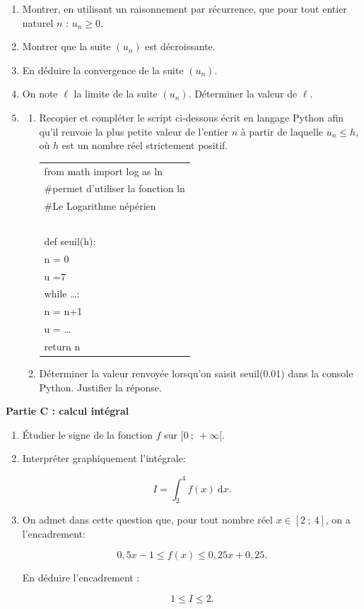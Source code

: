 \begin{enumerate}
\item Montrer, en utilisant un raisonnement par récurrence, que pour tout entier naturel $n$ :
$u_n \geqslant 0$.
\item Montrer que la suite $\left(u_n\right)$ est décroissante.
\item En déduire la convergence de la suite $\left(u_n\right)$.
\item On note $\ell$ la limite de la suite $\left(u_n\right)$. Déterminer la valeur de $\ell$. \item
	\begin{enumerate}
		\item Recopier et compléter le script ci-dessous écrit en langage Python afin qu'il
renvoie la plus petite valeur de l'entier $n$ à partir de laquelle $u_n \leqslant h$, où $h$ est un nombre réel strictement positif.

\begin{center}
\begin{tabular}{|l|}\hline
from math import log as ln\\
\#permet d'utiliser la fonction ln \\
\#Le Logarithme népérien\\
~\\
def seuil(h):\\
\quad n = 0\\
\quad u =7\\
\quad while \ldots :\\
\qquad n = n+1\\
\qquad u = \ldots\\
\quad return n\\ \hline
\end{tabular}
\end{center}

		\item Déterminer la valeur renvoyée lorsqu'on saisit seuil(0.01) dans la console Python. Justifier la réponse.
		\end{enumerate}
\end{enumerate}

\begin{center}\textbf{Partie C : calcul intégral}\end{center}

\begin{enumerate}
\item Étudier le signe de la fonction $f$ sur $[0~;~+\infty[$.
\item Interpréter graphiquement l'intégrale:

\[I = \displaystyle\int_2^4 f(x)\:\text{d}x.\]

\item On admet dans cette question que, pour tout nombre réel $x \in [2~;~4]$, on a
l'encadrement:

\[0,5x -1 \leqslant f(x) \leqslant 0,25x + 0,25.\]

En déduire l'encadrement :

\[ 1 \leqslant I \leqslant 2.\]
\end{enumerate}

\bigskip
